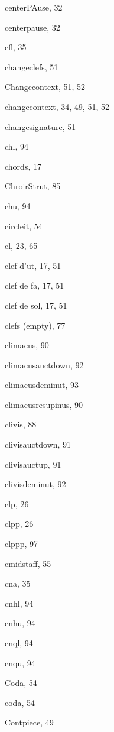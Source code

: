 \begin{theindex}
  \item {\Bslash centerPAuse}, 32
  \item {\Bslash centerpause}, 32
  \item {\Bslash cfl}, 35
  \item {\Bslash changeclefs}, 51
  \item {\Bslash Changecontext}, 51, 52
  \item {\Bslash changecontext}, 34, 49, 51, 52
  \item {\Bslash changesignature}, 51
  \item {\Bslash chl}, 94
  \item chords, 17
  \item {\Bslash ChroirStrut}, 85
  \item {\Bslash chu}, 94
  \item {\Bslash circleit}, 54
  \item {\Bslash cl}, 23, 65
  \item clef d'ut, 17, 51
  \item clef de fa, 17, 51
  \item clef de sol, 17, 51
  \item clefs (empty), 77
  \item {\Bslash climacus}, 90
  \item {\Bslash climacusauctdown}, 92
  \item {\Bslash climacusdeminut}, 93
  \item {\Bslash climacusresupinus}, 90
  \item {\Bslash clivis}, 88
  \item {\Bslash clivisauctdown}, 91
  \item {\Bslash clivisauctup}, 91
  \item {\Bslash clivisdeminut}, 92
  \item {\Bslash clp}, 26
  \item {\Bslash clpp}, 26
  \item {\Bslash clppp}, 97
  \item {\Bslash cmidstaff}, 55
  \item {\Bslash cna}, 35
  \item {\Bslash cnhl}, 94
  \item {\Bslash cnhu}, 94
  \item {\Bslash cnql}, 94
  \item {\Bslash cnqu}, 94
  \item {\Bslash Coda}, 54
  \item {\Bslash coda}, 54
  \item {\Bslash Contpiece}, 49

\end{theindex}
